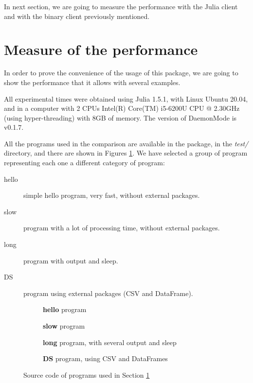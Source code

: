 \documentclass{juliacon}
\begin{document}
In next section, we are going to measure the performance with the Julia client
and with the binary client previously mentioned.

\section{Measure of the performance}
\label{sec:performance}

In order to prove the convenience of the usage of this package, we are going to
show the performance that it allows with several examples.

All experimental times  were obtained using Julia 1.5.1, with Linux Ubuntu
20.04, and in a computer with 2 CPUs Intel(R) Core(TM) i5-6200U CPU @ 2.30GHz
(using hyper-threading) with 8GB of memory. The version of DaemonMode is v0.1.7.

All the programs used in the comparison are available in the package, in the
\textit{test/} directory, and there are shown in Figures
\ref{fig:source_code}. We have selected a group of program representing each one
a different category of program:

\begin{description}
\item[hello] simple hello program, very fast, without external packages. 
\item[slow] program with a lot of processing time, without external packages.
\item[long] program with output and sleep.
\item[DS] program using external packages (CSV and DataFrame).

\end{description}

\begin{figure}[htp]
  \centering
  \begin{subfigure}[a]{\linewidth}
    
    \caption{\textbf{hello} program}
  \end{subfigure}
  \begin{subfigure}[b]{\linewidth}
    
    \caption{\textbf{slow} program}
  \end{subfigure}
  \begin{subfigure}[c]{\linewidth}
    
    \caption{\textbf{long} program, with several output and sleep}
  \end{subfigure}
  \begin{subfigure}[d]{\linewidth}
    
    \caption{\textbf{DS} program, using CSV and DataFrames\vspace{1em}}
  \end{subfigure}
  \caption{Source code of programs used in Section \ref{sec:performance}}
  \label{fig:source_code}
\end{figure}
\end{document}
